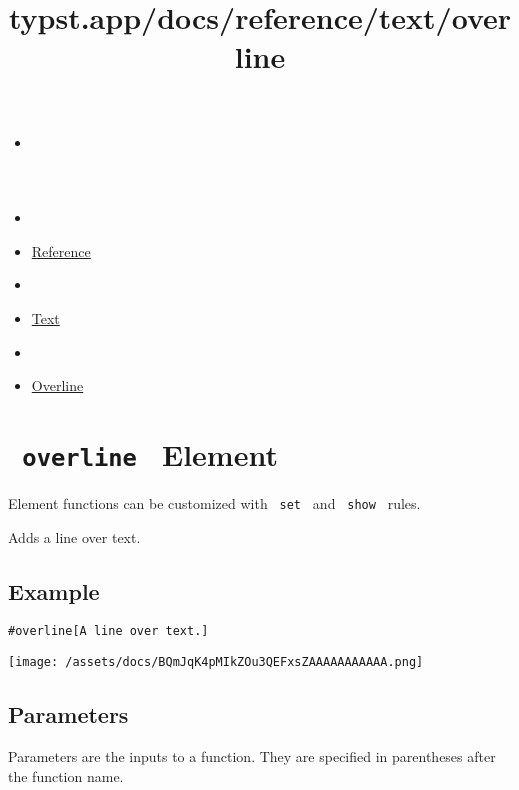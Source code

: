\title{typst.app/docs/reference/text/overline}

\begin{itemize}
\tightlist
\item
  \href{/docs}{}
\item
  
\item
  \href{/docs/reference/}{Reference}
\item
  
\item
  \href{/docs/reference/text/}{Text}
\item
  
\item
  \href{/docs/reference/text/overline/}{Overline}
\end{itemize}

\section{\texorpdfstring{\texttt{\ overline\ } {{ Element
}}}{ overline   Element }}\label{summary}

\label{element-tooltip}
Element functions can be customized with \texttt{\ set\ } and
\texttt{\ show\ } rules.

Adds a line over text.

\subsection{Example}\label{example}

\begin{verbatim}
#overline[A line over text.]
\end{verbatim}

\texttt{[image: /assets/docs/BQmJqK4pMIkZOu3QEFxsZAAAAAAAAAAA.png]}

\subsection{\texorpdfstring{{ Parameters
}}{ Parameters }}\label{parameters}

\label{parameters-tooltip}
Parameters are the inputs to a function. They are specified in
parentheses after the function name.

